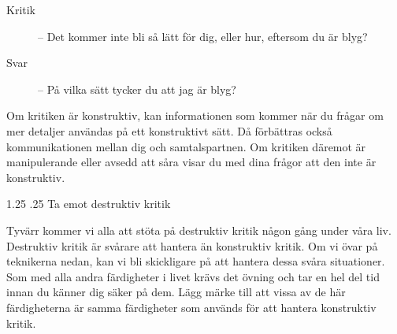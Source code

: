 \documentclass[swedish,a4paper]{book}
\makeatletter
\renewcommand\section{\@startsection{section}{1}{\z@}%
                                   {1.25\baselineskip}%
                                   {.25\baselineskip}%
                                   {\fontsize{1.25\baselineskip}{1.25\baselineskip}\selectfont\sffamily\bfseries}} %
\makeatother
\begin{document}
\begin{enumerate}
\begin{description}

\item[Kritik] -- Det kommer inte bli så lätt för dig, eller hur, eftersom du är blyg?

\item[Svar] -- På vilka sätt tycker du att jag är blyg?

\end{description}

Om kritiken är konstruktiv, kan informationen som kommer när du frågar om mer detaljer användas på ett konstruktivt sätt. Då förbättras också kommunikationen mellan dig och samtalspartnen. Om kritiken däremot är manipulerande eller avsedd att såra visar du med dina frågor att den inte är konstruktiv.

\end{enumerate}

\section{Ta emot destruktiv kritik}

Tyvärr kommer vi alla att stöta på destruktiv kritik någon gång under våra liv. Destruktiv kritik är svårare att hantera än konstruktiv kritik. Om vi övar på teknikerna nedan, kan vi bli skickligare på att hantera dessa svåra situationer. Som med alla andra färdigheter i livet krävs det övning och tar en hel del tid innan du känner dig säker på dem. Lägg märke till att vissa av de här färdigheterna är samma färdigheter som används för att hantera konstruktiv kritik.
\end{document}
